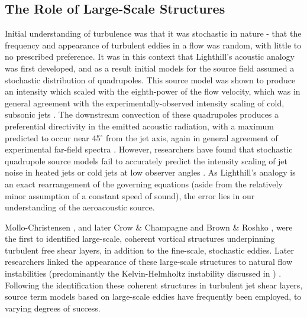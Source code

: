 \subsection{The Role of Large-Scale Structures}
Initial understanding of turbulence was that it was stochastic in nature - that the frequency and appearance of turbulent eddies in a flow was random, with little to no prescribed preference.
It was in this context that Lighthill's acoustic analogy was first developed, and as a result initial models for the source field assumed a stochastic distribution of quadrupoles.
This source model was shown to produce an intensity which scaled with the eighth-power of the flow velocity, which was in general agreement with the experimentally-observed intensity scaling of cold, subsonic jets \citep{Lighthill1954}.
The downstream convection of these quadrupoles produces a preferential directivity in the emitted acoustic radiation, with a maximum predicted to occur near 45$^\circ$ from the jet axis, again in general agreement of experimental far-field spectra \citep{Lighthill1954}.
However, researchers have found that stochastic quadrupole source models fail to accurately predict the intensity scaling of jet noise in heated jets or cold jets at low observer angles \citep{Tam1996}.
As Lighthill's analogy is an exact rearrangement of the governing equations (aside from the relatively minor assumption of a constant speed of sound), the error lies in our understanding of the aeroacoustic source. 

Mollo-Christensen \citep{Mollo-Christensen1967}, and later Crow \& Champagne \citep{Crow1971} and Brown \& Roshko \citep{Brown1974}, were the first to identified large-scale, coherent vortical structures underpinning turbulent free shear layers, in addition to the fine-scale, stochastic eddies.
Later researchers linked the appearance of these large-scale structures to natural flow instabilities (predominantly the Kelvin-Helmholtz instability discussed in ) \citep{Michalke1965,Michalke1984,Cohen1987}.
Following the identification these coherent structures in turbulent jet shear layers, source term models based on large-scale eddies have frequently been employed, to varying degrees of success. 

